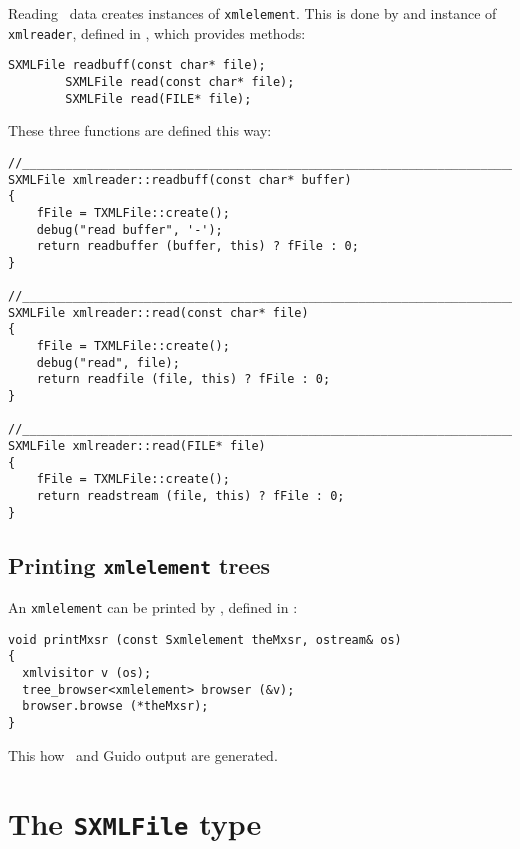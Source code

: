 Reading \mxml\ data creates instances of {\tt xmlelement}. This is done by and instance of {\tt xmlreader}, defined in , which provides methods:
\begin{lstlisting}[language=CPlusPlus]
		SXMLFile readbuff(const char* file);
		SXMLFile read(const char* file);
		SXMLFile read(FILE* file);
\end{lstlisting}

These three functions are defined this way:
\begin{lstlisting}[language=CPlusPlus]
//_______________________________________________________________________________
SXMLFile xmlreader::readbuff(const char* buffer)
{
	fFile = TXMLFile::create();
	debug("read buffer", '-');
	return readbuffer (buffer, this) ? fFile : 0;
}

//_______________________________________________________________________________
SXMLFile xmlreader::read(const char* file)
{
	fFile = TXMLFile::create();
	debug("read", file);
	return readfile (file, this) ? fFile : 0;
}

//_______________________________________________________________________________
SXMLFile xmlreader::read(FILE* file)
{
	fFile = TXMLFile::create();
	return readstream (file, this) ? fFile : 0;
}
\end{lstlisting}


	\subsection{Printing {\tt xmlelement} trees}

An {\tt xmlelement} can be printed by , defined in :
\begin{lstlisting}[language=CPlusPlus]
void printMxsr (const Sxmlelement theMxsr, ostream& os)
{
  xmlvisitor v (os);
  tree_browser<xmlelement> browser (&v);
  browser.browse (*theMxsr);
}
\end{lstlisting}

 This how \mxml\ and Guido output are generated.


\section{The {\tt SXMLFile} type}

